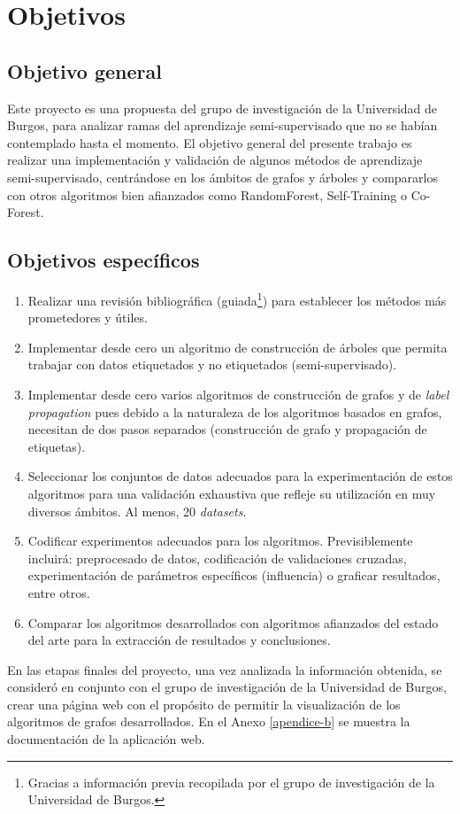 
\newpage
\chapter{Objetivos}
\label{objetivos}

\section{Objetivo general}

Este proyecto es una propuesta del grupo de investigación de la Universidad de Burgos, para analizar ramas del aprendizaje semi-supervisado que no se habían contemplado hasta el momento. El objetivo general del presente trabajo es realizar una implementación y validación de algunos métodos de aprendizaje semi-supervisado, centrándose en los ámbitos de grafos y árboles y compararlos con otros algoritmos bien afianzados como RandomForest, Self-Training o Co-Forest. 


\section{Objetivos específicos}

\begin{enumerate}[label=\destacado{\arabic*.}]
  \setlength\itemsep{0.5em}
  \item Realizar una revisión bibliográfica (guiada\footnote{Gracias a información previa recopilada por el grupo de investigación de la Universidad de Burgos.}) para establecer los métodos más prometedores y útiles.
  \item Implementar desde cero un algoritmo de construcción de árboles que permita trabajar con datos etiquetados y no etiquetados (semi-supervisado).
  \item Implementar desde cero varios algoritmos de construcción de grafos y de \textit{label propagation} pues debido a la naturaleza de los algoritmos basados en grafos, necesitan de dos pasos separados (construcción de grafo y propagación de etiquetas).
  \item Seleccionar los conjuntos de datos adecuados para la experimentación de estos algoritmos para una validación exhaustiva que refleje su utilización en muy diversos ámbitos. Al menos, 20 \textit{datasets}.
  \item Codificar experimentos adecuados para los algoritmos. Previsiblemente incluirá: preprocesado de datos, codificación de validaciones cruzadas, experimentación de parámetros específicos (influencia) o graficar resultados, entre otros.
  \item Comparar los algoritmos desarrollados con algoritmos afianzados del estado del arte para la extracción de resultados y conclusiones.
\end{enumerate}

En las etapas finales del proyecto, una vez analizada la información obtenida, se consideró en conjunto con el grupo de investigación de la Universidad de Burgos, crear una página web con el propósito de permitir la visualización de los algoritmos de grafos desarrollados. En el Anexo \ref{apendice-b} se muestra la documentación de la aplicación web.



